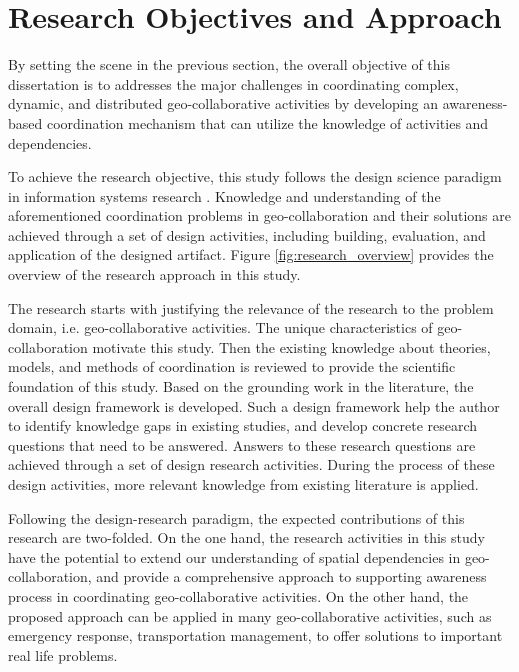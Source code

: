 \section{Research Objectives and Approach} %
\label{sec:research_objectives}
By setting the scene in the previous section, the overall objective of this dissertation is to addresses the major challenges in coordinating complex, dynamic, and distributed geo-collaborative activities by developing an awareness-based coordination mechanism that can utilize the knowledge of activities and dependencies.

To achieve the research objective, this study follows the design science paradigm in information systems research \cite{Hevner2004}. Knowledge and understanding of the aforementioned coordination problems in geo-collaboration and their solutions are achieved through a set of design activities, including building, evaluation, and application of the designed artifact. Figure \ref{fig:research_overview} provides the overview of the research approach in this study.

The research starts with justifying the relevance of the research to the problem domain, i.e. geo-collaborative activities. The unique characteristics of geo-collaboration motivate this study. Then the existing knowledge about theories, models, and methods of coordination is reviewed to provide the scientific foundation of this study. Based on the grounding work in the literature, the overall design framework is developed. Such a design framework help the author to identify knowledge gaps in existing studies, and develop concrete research questions that need to be answered. Answers to these research questions are achieved through a set of design research activities. During the process of these design activities, more relevant knowledge from existing literature is applied.

Following the design-research paradigm, the expected contributions of this research are two-folded. On the one hand, the research activities in this study have the potential to extend our understanding of spatial dependencies in geo-collaboration, and provide a comprehensive approach to supporting awareness process in coordinating geo-collaborative activities. On the other hand, the proposed approach can be applied in many geo-collaborative activities, such as emergency response, transportation management, to offer solutions to important real life problems.

